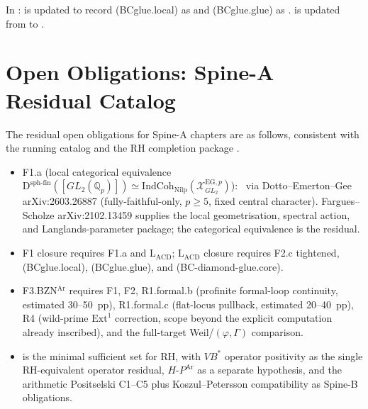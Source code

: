 In :
 is updated to record
(BCglue.local) as \ClaimStatusNeedsVerification and (BCglue.glue) as
\ClaimStatusConjectured.
 is updated from
\ClaimStatusNeedsVerification to \ClaimStatusConjectured.

\section{Open Obligations: Spine-A Residual Catalog}
\label{v4-arith:w3-audit-A:overall}

The residual open obligations for Spine-A chapters are as follows,
consistent with the running catalog 
and the RH completion package .

\begin{itemize}
\item F1.a (local categorical equivalence
\(\mathrm{D}^{\mathrm{sph\text{-}fin}}([GL_2(\mathbb{Q}_p)])
\simeq
\mathrm{IndCoh}_{\mathrm{Nilp}}(\mathcal{X}^{\mathrm{EG},p}_{GL_2})\)):
\ClaimStatusNeedsVerification\ via Dotto--Emerton--Gee
arXiv:2603.26887 (fully-faithful-only, \(p\geq 5\), fixed central
character). Fargues--Scholze arXiv:2102.13459 supplies the local
geometrisation, spectral action, and Langlands-parameter package;
the categorical equivalence is the residual.

\item F1 closure requires F1.a and \(\mathrm{L}_{\mathrm{ACD}}\);
\(\mathrm{L}_{\mathrm{ACD}}\) closure requires F2.c tightened,
(BCglue.local), (BCglue.glue), and (BC-diamond-glue.core).

\item F3.BZN\({}^{\mathrm{Ar}}\) requires F1, F2, R1.formal.b
(profinite formal-loop continuity, estimated 30--50~pp),
R1.formal.c (flat-locus pullback, estimated 20--40~pp),
R4 (wild-prime \(\mathrm{Ext}^1\) correction, scope beyond
the explicit computation already inscribed), and the
full-target Weil/\((\varphi,\Gamma)\) comparison.

\item {} is the minimal
sufficient set for RH, with \(VB^*\) operator positivity as the
single RH-equivalent operator residual, \(H\text{-}P^{\mathrm{Ar}}\)
as a separate hypothesis, and the arithmetic Positselski C1--C5
plus Koszul--Petersson compatibility as Spine-B obligations.
\end{itemize}
